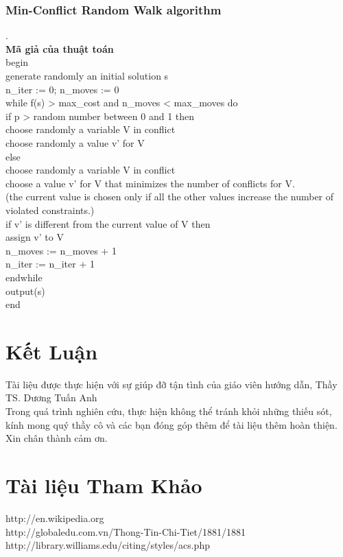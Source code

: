 \documentclass{hcmutarticle}
\begin{document}
\subsubsection{Min-Conflict Random Walk algorithm}.\\
{\bfseries Mã giả của thuật toán}\\
begin\\
   generate randomly an initial solution s\\
   n\_iter := 0; n\_moves := 0\\
   while f(s) > max\_cost and n\_moves < max\_moves do\\
      if p > random number between 0 and 1 then\\
        choose randomly a variable V in conflict\\
        choose randomly a value v’ for V\\
      else\\
         choose randomly a variable V in conflict\\
         choose a value v’ for V that minimizes the number of conflicts for V.\\
         (the current value is chosen only if all the other values increase the number of \\
           violated constraints.)\\
       if v’ is different from the current value of V then\\
          assign v’ to V\\
          n\_moves := n\_moves + 1\\
       n\_iter := n\_iter + 1\\
    endwhile\\
    output(s)\\
end\\
\section{Kết Luận }\label{result}
Tài liệu được thực hiện  với sự giúp đỡ tận tình của giáo viên hướng dẫn, Thầy TS. Dương Tuấn Anh\\
Trong quá trình nghiên cứu, thực hiện không thể tránh khỏi những  thiếu sót, kính mong quý thầy  cô và các bạn đóng góp thêm để tài liệu thêm hoàn thiện.\\
Xin chân thành cảm ơn.




\section{Tài liệu Tham Khảo }





http://en.wikipedia.org\\
http://globaledu.com.vn/Thong-Tin-Chi-Tiet/1881/1881\\
http://library.williams.edu/citing/styles/acs.php\\

\end{document}
